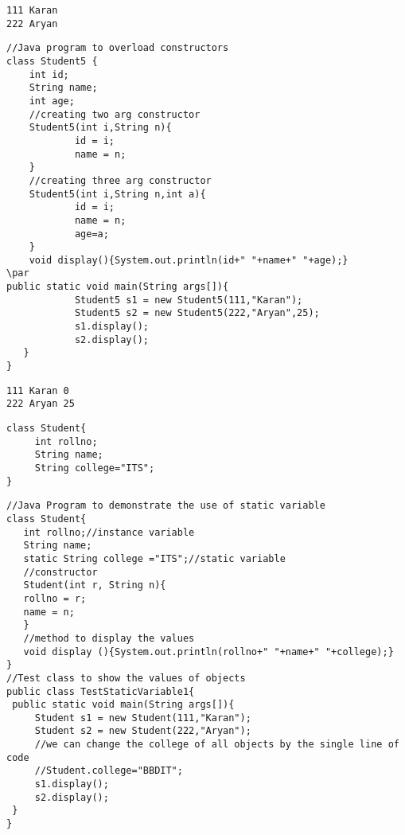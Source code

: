 \documentclass{book}
\def\lthtmlcheckvsize{\ifdim\ht\sizebox<\vsize 
  \ifdim\wd\sizebox<\hsize\expandafter\hfill\fi \expandafter\vfill
  \else\expandafter\vss\fi}%
\begin{document}
{\newpage\clearpage
{}%
\begin{lstlisting}
111 Karan
222 Aryan
\end{lstlisting}%
\lthtmlfigureZ
\lthtmlcheckvsize\clearpage}

{\newpage\clearpage
{}%
\begin{lstlisting}
//Java program to overload constructors  
class Student5 {  
    int id;  
    String name;  
    int age;  
    //creating two arg constructor  
    Student5(int i,String n){  
			id = i;  
			name = n;  
    }  
    //creating three arg constructor  
    Student5(int i,String n,int a){  
			id = i;  
			name = n;  
			age=a;  
    }  
    void display(){System.out.println(id+" "+name+" "+age);}  
\par
public static void main(String args[]){  
			Student5 s1 = new Student5(111,"Karan");  
			Student5 s2 = new Student5(222,"Aryan",25);  
			s1.display();  
			s2.display();  
   }  
}  
\end{lstlisting}%
\lthtmlfigureZ
\lthtmlcheckvsize\clearpage}

{\newpage\clearpage
{}%
\begin{lstlisting}
111 Karan 0
222 Aryan 25
\end{lstlisting}%
\lthtmlfigureZ
\lthtmlcheckvsize\clearpage}

{\newpage\clearpage
{}%
\begin{lstlisting}
class Student{  
     int rollno;  
     String name;  
     String college="ITS";  
}  
\end{lstlisting}%
\lthtmlfigureZ
\lthtmlcheckvsize\clearpage}

{\newpage\clearpage
{}%
\begin{lstlisting}
//Java Program to demonstrate the use of static variable  
class Student{  
   int rollno;//instance variable  
   String name;  
   static String college ="ITS";//static variable  
   //constructor  
   Student(int r, String n){  
   rollno = r;  
   name = n;  
   }  
   //method to display the values  
   void display (){System.out.println(rollno+" "+name+" "+college);}  
}  
//Test class to show the values of objects  
public class TestStaticVariable1{  
 public static void main(String args[]){  
	 Student s1 = new Student(111,"Karan");  
	 Student s2 = new Student(222,"Aryan");  
	 //we can change the college of all objects by the single line of code  
	 //Student.college="BBDIT";  
	 s1.display();  
	 s2.display();  
 }  
} 
\end{lstlisting}%
\lthtmlfigureZ
\lthtmlcheckvsize\clearpage}
\end{document}
